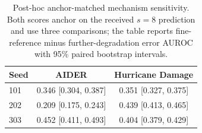 \begin{table}[t]
\centering
\caption{Post-hoc anchor-matched mechanism sensitivity. Both scores anchor on the received $s=8$ prediction and use three comparisons; the table reports fine-reference minus further-degradation error AUROC with 95\% paired bootstrap intervals.}
\label{tab:anchor-matched}
\begin{tabular}{lcc}
\toprule
Seed & AIDER & Hurricane Damage \\
\midrule
101 & 0.346 [0.304, 0.387] & 0.351 [0.327, 0.375] \\
202 & 0.209 [0.175, 0.243] & 0.439 [0.413, 0.465] \\
303 & 0.452 [0.411, 0.493] & 0.404 [0.379, 0.429] \\
\bottomrule
\end{tabular}
\end{table}
